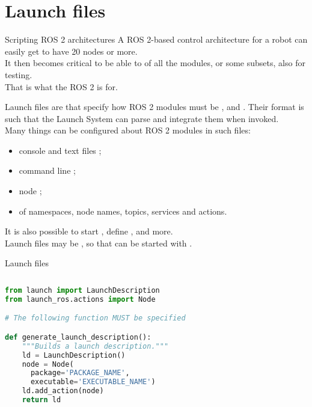 
\section{Launch files}

\begin{frame}{Scripting ROS 2 architectures}
	A ROS 2-based control architecture for a robot can easily get to have 20 nodes or more.\\
	\bigskip
	It then becomes critical to be able to  of all the modules, or some subsets, also for testing.\\
	\bigskip
	That is what the ROS 2  is for.
\end{frame}

\begin{frame}{Launch files}
	 are  that specify how ROS 2 modules must be ,  and . Their format is such that the Launch System can parse and integrate them when invoked.\\\vspace{10pt}
	Many things can be configured about ROS 2 modules in such files:
	\begin{itemize}
		\item console and text files ;
		\item command line ;
		\item node ;
		\item {} of namespaces, node names, topics, services and actions.
	\end{itemize}
	\vspace{10pt}
	It is also possible to start , define , and more.\\\vspace{10pt}
	Launch files may be , so that  can be started with .
\end{frame}
\begin{frame}[fragile]{Launch files}
	\begin{columns}
		\begin{lstlisting}[language=Python, caption=Minimal example of a launch file that starts a ROS 2 node.]
from launch import LaunchDescription
from launch_ros.actions import Node

# The following function MUST be specified

def generate_launch_description():
    """Builds a launch description."""
    ld = LaunchDescription()
    node = Node(
      package='PACKAGE_NAME',
      executable='EXECUTABLE_NAME')
    ld.add_action(node)
    return ld
\end{lstlisting}
	\end{columns}
\end{frame}

